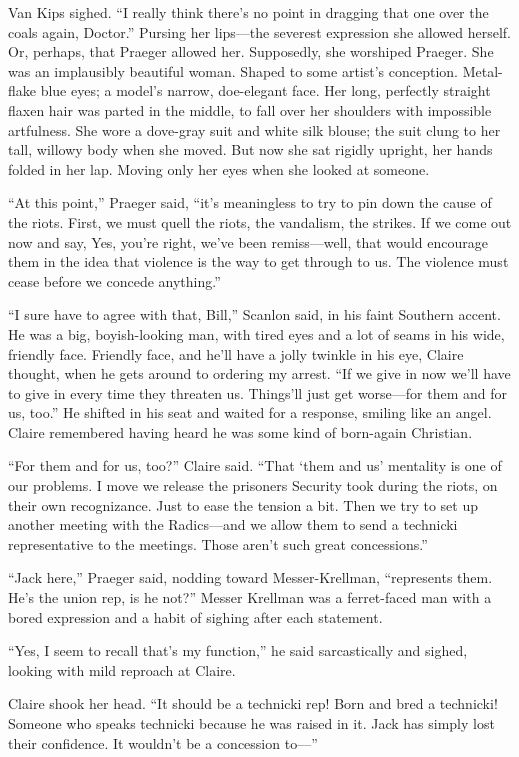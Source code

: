 Van Kips sighed. “I really think there’s no point in dragging that one over the coals again, Doctor.” Pursing her lips—the severest expression she allowed herself. Or, perhaps, that Praeger allowed her. Supposedly, she worshiped Praeger. She was an implausibly beautiful woman. Shaped to some artist’s conception. Metal-flake blue eyes; a model’s narrow, doe-elegant face. Her long, perfectly straight flaxen hair was parted in the middle, to fall over her shoulders with impossible artfulness. She wore a dove-gray suit and white silk blouse; the suit clung to her tall, willowy body when she moved. But now she sat rigidly upright, her hands folded in her lap. Moving only her eyes when she looked at someone.

“At this point,” Praeger said, “it’s meaningless to try to pin down the cause of the riots. First, we must quell the riots, the vandalism, the strikes. If we come out now and say, Yes, you’re right, we’ve been remiss—well, that would encourage them in the idea that violence is the way to get through to us. The violence must cease before we concede anything.”

“I sure have to agree with that, Bill,” Scanlon said, in his faint Southern accent. He was a big, boyish-looking man, with tired eyes and a lot of seams in his wide, friendly face. Friendly face, and he’ll have a jolly twinkle in his eye, Claire thought, when he gets around to ordering my arrest. “If we give in now we’ll have to give in every time they threaten us. Things’ll just get worse—for them and for us, too.” He shifted in his seat and waited for a response, smiling like an angel. Claire remembered having heard he was some kind of born-again Christian.

“For them and for us, too?” Claire said. “That ‘them and us’ mentality is one of our problems. I move we release the prisoners Security took during the riots, on their own recognizance. Just to ease the tension a bit. Then we try to set up another meeting with the Radics—and we allow them to send a technicki representative to the meetings. Those aren’t such great concessions.”

“Jack here,” Praeger said, nodding toward Messer-Krellman, “represents them. He’s the union rep, is he not?” Messer Krellman was a ferret-faced man with a bored expression and a habit of sighing after each statement.

“Yes, I seem to recall that’s my function,” he said sarcastically and sighed, looking with mild reproach at Claire.

Claire shook her head. “It should be a technicki rep! Born and bred a technicki! Someone who speaks technicki because he was raised in it. Jack has simply lost their confidence. It wouldn’t be a concession to—”

